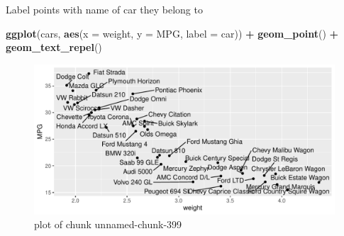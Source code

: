 \documentclass[
  ignorenonframetext,
]{beamer}
\newenvironment{Shaded}{\begin{snugshade}}{\end{snugshade}}
\newcommand{\DataTypeTok}[1]{\textcolor[rgb]{0.13,0.29,0.53}{#1}}
\newcommand{\KeywordTok}[1]{\textcolor[rgb]{0.13,0.29,0.53}{\textbf{#1}}}
\newcommand{\NormalTok}[1]{#1}
\newcommand{\OperatorTok}[1]{\textcolor[rgb]{0.81,0.36,0.00}{\textbf{#1}}}
\newcommand{\StringTok}[1]{\textcolor[rgb]{0.31,0.60,0.02}{#1}}
\begin{document}
\begin{frame}[fragile]{Label points with name of car they belong to}
\protect\hypertarget{label-points-with-name-of-car-they-belong-to}{}

\begin{Shaded}
\begin{Highlighting}[]
\KeywordTok{ggplot}\NormalTok{(cars, }\KeywordTok{aes}\NormalTok{(}\DataTypeTok{x =}\NormalTok{ weight, }\DataTypeTok{y =}\NormalTok{ MPG, }\DataTypeTok{label =}\NormalTok{ car)) }\OperatorTok{+}
\StringTok{  }\KeywordTok{geom_point}\NormalTok{() }\OperatorTok{+}\StringTok{ }\KeywordTok{geom_text_repel}\NormalTok{()}
\end{Highlighting}
\end{Shaded}

\begin{figure}
\centering
\includegraphics{figure/unnamed-chunk-399-1.pdf}
\caption{plot of chunk unnamed-chunk-399}
\end{figure}

\end{frame}
\end{document}
